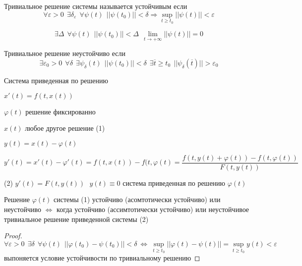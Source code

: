 \begin{define}
  Тривиальное решение системы называется устойчивым если
  $$
  \forall \varepsilon > 0 ~~ \exists \delta_{\varepsilon} ~~ \forall \psi(t) ~~
  ||\psi(t_0)|| < \delta \Rightarrow \sup_{t \ge t_0} ||\psi(t)|| < \varepsilon
  $$
\end{define}

\begin{define}
  $$
  \exists \Delta ~~ \forall \psi(t) ~~ ||\psi(t_0)|| < \Delta ~~
  \lim_{t \to + \infty} ||\psi(t)|| = 0
  $$
\end{define}

\begin{define}
  Тривиальное решение неустойчиво если
  $$
  \exists \varepsilon_0 > 0 ~~ \forall \delta ~~ \exists \psi_{\delta}(t) ~~
  ||\psi(t_0)|| < \delta ~~ \exists \overline{t} \ge t_0 ~~
  ||\psi_{\delta}(\overline{t})|| > \varepsilon_0
  $$
\end{define}

\begin{title}[\Large]
  Система приведенная по решению
\end{title}

$x'(t) = f(t, x(t))$

$\varphi(t)$ решение фиксированно

$x(t)$ любое другое решение (1)

$y(t) = x(t) - \varphi(t)$

$$
y'(t) = x'(t) - \varphi'(t) = f(t, x(t)) - f(t, \varphi(t) = \frac{f(t, y(t) +
\varphi(t)) - f(t, \varphi(t))}{F(t, y(t))}
$$

(2) $y'(t) = F(t, y(t)) ~~~ y(t) \equiv 0$ система приведенная по решению
$\varphi(t)$

\begin{block}[Утверждение]
  Решение $\varphi(t)$ системы (1) устойчиво (асомтотически устойчиво) или
  неустойчиво $\Leftrightarrow$ когда устойчиво (ассимтотически устойчиво) или
  неустойчивое тривиальное решение приведенной системы (2)
\end{block}

\begin{proof}
  $$
  \forall \varepsilon > 0 ~~ \exists \delta ~~ \forall \psi(t) ~~
  ||\varphi(t_0) - \psi(t_0)|| < \delta ~ \Leftrightarrow ~ \sup_{t \ge t_0}
  ||\varphi(t) - \psi(t)|| = \sup_{t \ge t_0} y(t) < \varepsilon
  $$
  выпоняется условие устойчивости по тривиальному решению
\end{proof}

